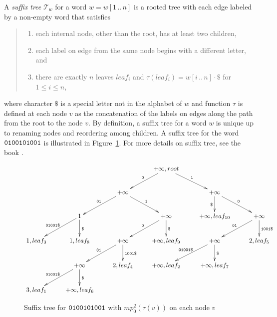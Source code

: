 \documentclass{article}
\def\subw#1#2#3{{#1[#2\,..\,#3]}}
\def\tree{\mathcal{T}}
\begin{document}
A \emph{suffix tree} $\tree_w$ for a word $w=\subw{w}{1}{n}$ is a
rooted tree with each edge labeled by a non-empty word that
satisfies
\begin{quote}
\begin{enumerate}
  \item each internal node, other than the root, has at least two children,
  \item each label on edge from the same node begins with a different letter, and
  \item there are exactly $n$ leaves $leaf_i$ and
  $\tau(leaf_i)=\subw{w}{i}{n}\cdot\$$ for $1\leq i\leq n$,
\end{enumerate}
\end{quote}
where character $\$$ is a special letter not in the alphabet of $w$
and function $\tau$ is defined at each node $v$ as the concatenation
of the labels on edges along the path from the root to the node $v$.
By definition, a suffix tree for a word $w$ is unique up to renaming
nodes and reordering among children. A suffix tree for the word
$\tt0100101001$ is illustrated in Figure~\ref{figure:suffixtree}.
For more details on suffix tree, see the book
\cite[Chap.~5--9]{Gusfield1997}.


\begin{figure}
\center
  \[\xymatrix{
  & & & +\infty,root\ar[dl]_{\tt0}\ar[dr]^{\tt1} & & \\
  & & +\infty\ar[dl]_{\tt01}\ar[dr]^{\tt1} & & +\infty\ar[dr]^{\tt0}\ar[d]_{\$} & \\
  & 1\ar[dl]_{\tt01001\$}\ar[d]^{\$} & & +\infty\ar[dl]_{\tt0}\ar[d]^{\$} & +\infty,leaf_{10} & +\infty\ar[dl]_{\tt01}\ar[d]^{\tt1001\$} \\
  1,leaf_3 & 1,leaf_8 & +\infty\ar[dl]_{\tt01}\ar[d]^{\tt1001\$} & +\infty,leaf_9 & +\infty\ar[dl]_{\tt01001\$}\ar[d]^{\$} & 2,leaf_5 \\
  & +\infty\ar[dl]_{\tt01001\$}\ar[d]^{\$} & 2,leaf_4 & +\infty,leaf_2 & +\infty,leaf_7 & \\
  3,leaf_1 & +\infty,leaf_6 & & & &
  }\]
\caption{Suffix tree for $\tt0100101001$ with $mp_0^2(\tau(v))$ on
each node $v$}\label{figure:suffixtree}
\end{figure}
\end{document}
